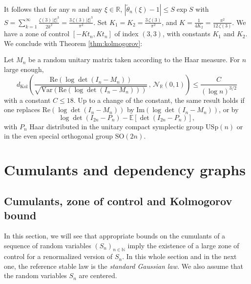 \documentclass[envcountsame]{svmult}
\newcommand{\N}{\mathbb{N}}
\newcommand{\R}{\mathbb{R}}
\newcommand{\esper}{\mathbb{E}}
\newcommand{\dkol}{d_\mathrm{Kol}}
\newcommand{\gauss}{\mathcal{N}_{\R}(0,1)}
\begin{document}
It follows that for any $n$ and any $\xi \in \R$,
$|\widetilde{\theta}_n(\xi)-1| \leq S\exp S$
with $S = \sum_{k=1}^\infty \frac{\zeta(3)\, |\xi|^3}{2k^2} = \frac{3\,\zeta(3)\,|\xi|^3}{\pi^2}$. Set $K_1=K_2 = \frac{3\,\zeta(3)}{\pi^2}$, and $K=\frac{1}{4K_2} = \frac{\pi^2}{12\,\zeta(3)}$. We have a zone of control $[-Kt_n,Kt_n]$ of index $(3,3)$, with constants $K_1$ and $K_2$. We conclude with Theorem \ref{thm:kolmogorov}:
\begin{proposition}
Let $M_n$ be a random unitary matrix taken according to the Haar measure. For $n$ large enough,
$$\dkol\left(\frac{\mathrm{Re}(\log \det(I_n-M_n))}{\sqrt{\mathrm{Var}(\mathrm{Re}(\log \det(I_n-M_n)))}}\,,\,\gauss\right) \leq \frac{C}{(\log n)^{3/2}}$$
with a constant $C \leq 18$. Up to a change of the constant, the same result holds if one replaces $\mathrm{Re}(\log \det(I_n-M_n))$ by $\mathrm{Im}(\log \det(I_n-M_n))$, or by
$$\log \det(I_{2n}-P_n) - \esper[\det(I_{2n}-P_n)],$$
with $P_n$ Haar distributed in the unitary compact symplectic group $\mathrm{USp}(n)$ or in the even special orthogonal group $\mathrm{SO}(2n)$.
\end{proposition}



















\section{Cumulants and dependency graphs}\label{sec:dependency}



\subsection{Cumulants, zone of control and Kolmogorov bound}
In this section, we will see that appropriate bounds on the cumulants
of a sequence of random variables $(S_n)_{n \in \N}$
imply the existence of a large zone of control
for a renormalized version of $S_n$.
In this whole section and in the next one, the reference stable law is the {\em standard Gaussian law.}
We also assume that the random variables $S_n$ are centered.
\medskip
\end{document}
